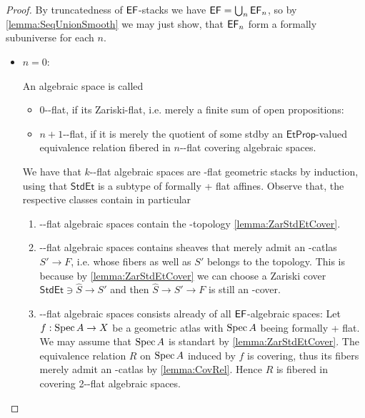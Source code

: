 \begin{proof}
	By truncatedness of $\mathsf{EF}$-stacks we have $\mathsf{EF} = \bigcup_n \mathsf{EF}_n$, so by \ref{lemma:SeqUnionSmooth} we may just show, that $\mathsf{EF}_n$ form a formally \etale subuniverse for each $n$. 
	\begin{itemize}
		\item $n=0$: 
		
		An algebraic space is called 
		\begin{itemize}
			\item 0-\etale-flat, if its Zariski-flat, i.e. merely a finite sum of open propositions: 
			\item $n+1$-\etale-flat, if it is merely the quotient of some std\etale by an $\mathsf{EtProp}$-valued equivalence relation fibered in $n$-\etale-flat covering algebraic spaces.
		\end{itemize}
		We have that $k$-\etale-flat algebraic spaces are \etale-flat geometric stacks by induction, using that $\mathsf{StdEt}$ is a subtype of formally \etale + flat affines.
		Observe that, the respective classes contain in particular
		\begin{enumerate}
			\item -\etale-flat algebraic spaces contain the \etale-topology \ref{lemma:ZarStdEtCover}.
			\item -\etale-flat algebraic spaces contains sheaves that merely admit an \etale-catlas $ S' \to F$, i.e. whose fibers as well as $S'$ belongs to the \etale topology. This is because by \ref{lemma:ZarStdEtCover} we can choose a Zariski cover $\mathsf{StdEt} \ni \hat S \to S'$ and then $\hat S \to S' \to F$ is still an \etale-cover. \\
			\item -\etale-flat algebraic spaces consists already of all $\mathsf{EF}$-algebraic spaces: Let $f : \operatorname{Spec} A \to X$ be a geometric atlas with $\operatorname{Spec} A$ beeing formally \etale + flat. We may assume that $\operatorname{Spec} A$ is standart \etale by \ref{lemma:ZarStdEtCover}. The equivalence relation $R$ on $\operatorname{Spec} A$ induced by $f$ is covering, thus its fibers merely admit an \etale-catlas by \ref{lemma:CovRel}. Hence $R$ is fibered in covering 2-\etale-flat algebraic spaces.

\end{enumerate}
\end{itemize}
\end{proof}
